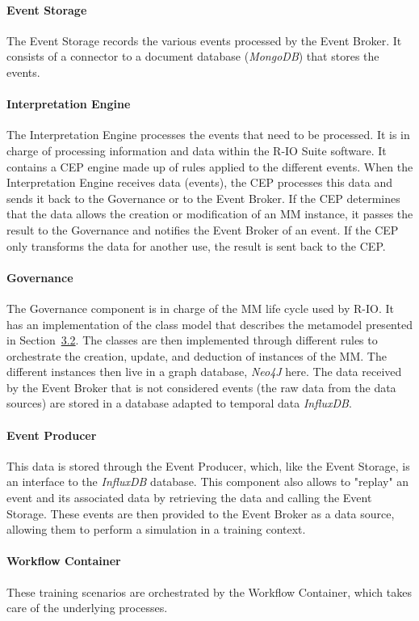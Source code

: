 \paragraph{Event Storage}
The Event Storage records the various events processed by the Event Broker.
It consists of a connector to a document database (\textit{MongoDB}) that stores the events.
\paragraph{Interpretation Engine}
The Interpretation Engine processes the events that need to be processed.
It is in charge of processing information and data within the R-IO Suite software.
It contains a CEP engine made up of rules applied to the different events.
When the Interpretation Engine receives data (events), the CEP processes this data and sends it back to the Governance or to the Event Broker.
If the CEP determines that the data allows the creation or modification of an MM instance, it passes the result to the Governance and notifies the Event Broker of an event.
If the CEP only transforms the data for another use, the result is sent back to the CEP.
\paragraph{Governance}
The Governance component is in charge of the MM life cycle used by R-IO.
It has an implementation of the class model that describes the metamodel presented in Section~\hyperref[sec:crisismetamodel]{3.2}.
The classes are then implemented through different rules to orchestrate the creation, update, and deduction of instances of the MM.
The different instances then live in a graph database, \textit{Neo4J} here.
The data received by the Event Broker that is not considered events (the raw data from the data sources) are stored in a database adapted to temporal data \textit{InfluxDB}.
\paragraph{Event Producer}
This data is stored through the Event Producer, which, like the Event Storage, is an interface to the \textit{InfluxDB} database.
This component also allows to "replay" an event and its associated data by retrieving the data and calling the Event Storage.
These events are then provided to the Event Broker as a data source, allowing them to perform a simulation in a training context.
\paragraph{Workflow Container}
These training scenarios are orchestrated by the Workflow Container, which takes care of the underlying processes.
